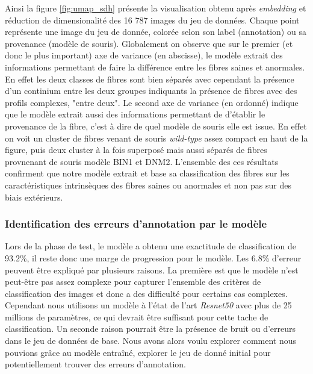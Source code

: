 Ainsi la figure \ref{fig:umap_sdh} présente la visualisation obtenu après \textit{embedding} et réduction de dimensionalité des 16 787 images du jeu de données. Chaque point représente une image du jeu de donnée, colorée selon son label (annotation) ou sa provenance (modèle de souris). Globalement on observe que sur le premier (et donc le plus important) axe de variance (en abscisse), le modèle extrait des informations permettant de faire la différence entre les fibres saines et anormales. En effet les deux classes de fibres sont bien séparés avec cependant la présence d'un continium entre les deux groupes indiquants la présence de fibres avec des profils complexes, "entre deux". Le second axe de variance (en ordonné) indique que le modèle extrait aussi des informations permettant de d'établir le provenance de la fibre, c'est à dire de quel modèle de souris elle est issue. En effet on voit un cluster de fibres venant de souris \textit{wild-type} assez compact en haut de la figure, puis deux cluster à la fois superposé mais aussi séparés de fibres provnenant de souris modèle BIN1 et DNM2. L'ensemble des ces résultats confirment que notre modèle extrait et base sa classification des fibres sur les caractéristiques intrinsèques des fibres saines ou anormales et non pas sur des biais extérieurs.

\subsubsection{Identification des erreurs d'annotation par le modèle}
Lors de la phase de test, le modèle a obtenu une exactitude de classification de 93.2\%, il reste donc une marge de progression pour le modèle. Les 6.8\% d'erreur peuvent être expliqué par plusieurs raisons. La première est que le modèle n'est peut-être pas assez complexe pour capturer l'ensemble des critères de classification des images et donc a des difficulté pour certains cas complexes. Cependant nous utilisons un modèle à l'état de l'art \textit{Resnet50} avec plus de 25 millions de paramètres, ce qui devrait être suffisant pour cette tache de classification. Un seconde raison pourrait être la présence de bruit ou d'erreurs dans le jeu de données de base. Nous avons alors voulu explorer comment nous pouvions grâce au modèle entraîné, explorer le jeu de donné initial pour potentiellement trouver des erreurs d'annotation.

